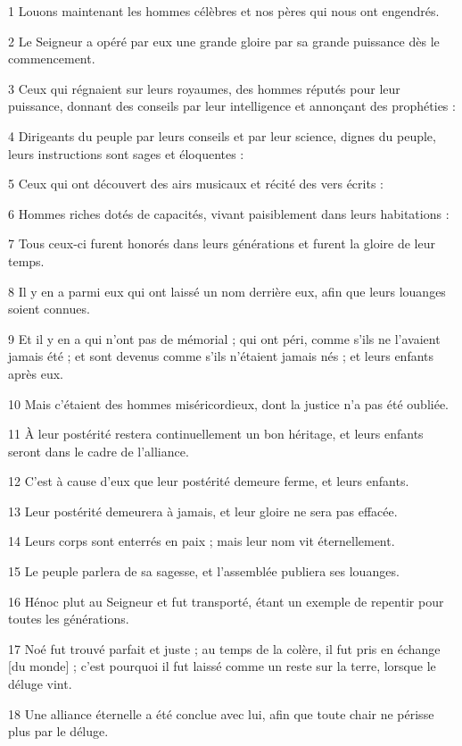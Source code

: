 \par 1 Louons maintenant les hommes célèbres et nos pères qui nous ont engendrés.
\par 2 Le Seigneur a opéré par eux une grande gloire par sa grande puissance dès le commencement.
\par 3 Ceux qui régnaient sur leurs royaumes, des hommes réputés pour leur puissance, donnant des conseils par leur intelligence et annonçant des prophéties :
\par 4 Dirigeants du peuple par leurs conseils et par leur science, dignes du peuple, leurs instructions sont sages et éloquentes :
\par 5 Ceux qui ont découvert des airs musicaux et récité des vers écrits :
\par 6 Hommes riches dotés de capacités, vivant paisiblement dans leurs habitations :
\par 7 Tous ceux-ci furent honorés dans leurs générations et furent la gloire de leur temps.
\par 8 Il y en a parmi eux qui ont laissé un nom derrière eux, afin que leurs louanges soient connues.
\par 9 Et il y en a qui n'ont pas de mémorial ; qui ont péri, comme s'ils ne l'avaient jamais été ; et sont devenus comme s'ils n'étaient jamais nés ; et leurs enfants après eux.
\par 10 Mais c'étaient des hommes miséricordieux, dont la justice n'a pas été oubliée.
\par 11 À leur postérité restera continuellement un bon héritage, et leurs enfants seront dans le cadre de l'alliance.
\par 12 C'est à cause d'eux que leur postérité demeure ferme, et leurs enfants.
\par 13 Leur postérité demeurera à jamais, et leur gloire ne sera pas effacée.
\par 14 Leurs corps sont enterrés en paix ; mais leur nom vit éternellement.
\par 15 Le peuple parlera de sa sagesse, et l'assemblée publiera ses louanges.
\par 16 Hénoc plut au Seigneur et fut transporté, étant un exemple de repentir pour toutes les générations.
\par 17 Noé fut trouvé parfait et juste ; au temps de la colère, il fut pris en échange [du monde] ; c'est pourquoi il fut laissé comme un reste sur la terre, lorsque le déluge vint.
\par 18 Une alliance éternelle a été conclue avec lui, afin que toute chair ne périsse plus par le déluge.
